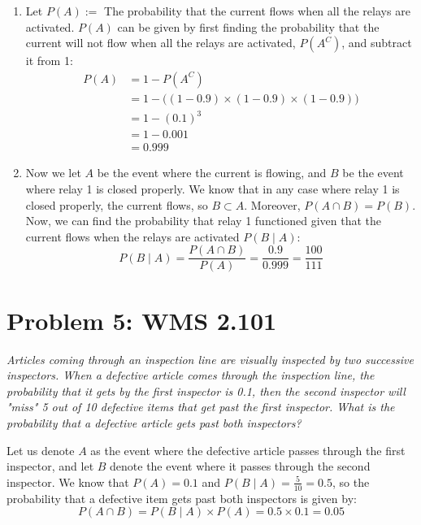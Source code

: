 \documentclass{article}
\begin{document}
	\begin{sol}
		\begin{enumerate}
			\item Let $P(A) := $ The probability that the current flows when all the relays are activated. $P(A)$ can be given by first finding the probability that the current will not flow when all the relays are activated, $P(A^C)$, and subtract it from 1:
			\begin{align*}
				P(A) &= 1 - P(A^C)\\
				&= 1 - \big( (1-0.9) \times (1-0.9) \times (1-0.9) \big) \\
				&= 1 - (0.1)^3 \\
				&= 1 - 0.001 \\
				&= \boxed{0.999}
			\end{align*}
		
			\item Now we let $A$ be the event where the current is flowing, and $B$ be the event where relay 1 is closed properly. We know that in any case where relay 1 is closed properly, the current flows, so $B \subset A$. Moreover, $P(A \cap B) = P(B)$. Now, we can find the probability that relay 1 functioned given that the current flows when the relays are activated $P(B \mid A)$:
			$$ P(B \mid A) = \frac{P(A \cap B)}{P(A)} = \frac{0.9}{0.999} = \boxed{\frac{100}{111}}$$
		\end{enumerate}
	\end{sol}

\pagebreak

\section*{Problem 5: WMS 2.101}
	\emph{Articles coming through an inspection line are visually inspected by two successive inspectors. When a defective article comes through the inspection line, the probability that it gets by the first inspector is 0.1, then the second inspector will "miss" 5 out of 10 defective items that get past the first inspector. What is the probability that a defective article gets past both inspectors?}
	
	\begin{sol}
		Let us denote $A$ as the event where the defective article passes through the first inspector, and let $B$ denote the event where it passes through the second inspector. We know that $P(A) = 0.1$ and $P(B \mid A) = \frac{5}{10} = 0.5$, so the probability that a defective item gets past both inspectors is given by:
		$$ P(A \cap B) = P(B \mid A) \times P(A) = 0.5 \times 0.1 = \boxed{0.05} $$
	\end{sol}
\end{document}
